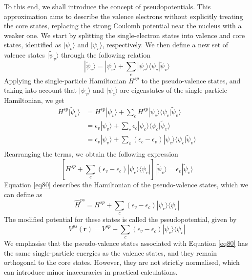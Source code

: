 To this end, we shall introduce the concept of pseudopotentials\supercite{Hellmann1935}.
This approximation aims to describe the valence electrons without explicitly treating 
the core states, replacing the strong Coulomb potential near the nucleus with a 
weaker one. We start by splitting the single-electron states into valence and 
core states, identified as $|\psi_{v}\rangle$ and $|\psi_{c}\rangle$, respectively. We then define 
a new set of valence states $|\tilde{\psi}_{v}\rangle$  through the following 
relation 
\begin{equation}
    \label{eq78}
    |\tilde{\psi}_{v}\rangle = |\psi_{v}\rangle + \sum_{c} |\psi_{c}\rangle 
    \langle \psi_{c} |\tilde{\psi}_{v}\rangle
\end{equation}
Applying the single-particle Hamiltonian $H^{sp}$ to the pseudo-valence states,
and taking into account that $|\psi_{v}\rangle$ and $|\psi_{c}\rangle$ are eigenstates of the
single-particle Hamiltonian, we get
\begin{equation}
    \label{eq79}
    \begin{aligned}
    H^{sp} |\tilde{\psi}_{v}\rangle &= H^{sp}|\psi_{v}\rangle  + 
    \sum_{c} H^{sp}|\psi_{c}\rangle \langle \psi_{c} |\tilde{\psi}_{v}\rangle\\
    &= \epsilon_{v} |\psi_{v}\rangle + \sum_{c} \epsilon_{c} |\psi_{c}\rangle
    \langle \psi_{c} |\tilde{\psi}_{v}\rangle\\
    &= \epsilon_{v} |\psi_{v}\rangle + \sum_{c} (\epsilon_{c} - \epsilon_{v}) |\psi_{c}\rangle
    \langle \psi_{c} |\tilde{\psi}_{v}\rangle\\
    \end{aligned}
\end{equation}
Rearranging the terms, we obtain the following expression
\begin{equation}
    \label{eq80}
    \left[H^{sp} + \sum_{c} (\epsilon_{v} - \epsilon_{c})|\psi_{c}\rangle \langle \psi_{c} | \right] 
    |\tilde{\psi}_{v}\rangle = \epsilon_{v} |\tilde{\psi}_{v}\rangle
\end{equation}
Equation \ref{eq80} describes the Hamiltonian of the pseudo-valence states,
which we can define as 
\begin{equation}
    \label{eq81}
    \hat{H}^{ps} = H^{sp} + \sum_{c} (\epsilon_{v} - \epsilon_{c})|\psi_{c}\rangle \langle \psi_{c} |
\end{equation}
The modified potential for these states is called the pseudopotential, given 
by 
\begin{equation}
    \label{eq82}
    V^{ps}(\mathbf{r}) = V^{sp} + \sum_{c} (\epsilon_{v} - \epsilon_{c})|\psi_{c}\rangle \langle \psi_{c} |
\end{equation}
We emphasise that the pseudo-valence states associated with 
Equation \ref{eq80} has the same single-particle energies as the valence states, and they remain 
orthogonal to the core states. However, they are not strictly normalised, which can introduce 
minor inaccuracies in practical calculations. 

